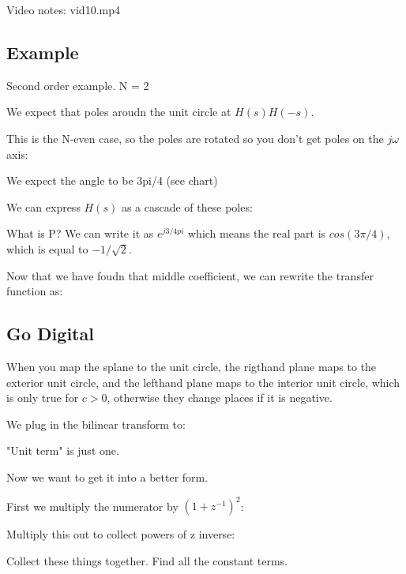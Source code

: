 Video notes: vid10.mp4

\subsection*{Example}
Second order example.  N = 2

We expect that poles aroudn the unit circle at $H(s)H(-s)$.

This is the N-even case, so the poles are rotated so you don't get 
poles on the $j\omega$ axis:

We expect the angle to be 3pi/4 (see chart)


We can express $H(s)$ as a cascade of these poles:



What is P? We can write it as $e^{j3/4pi}$ which means the real part is
$cos(3\pi/4)$, which is equal to $-1/\sqrt{2}$. 


Now that we have foudn that middle coefficient, we can rewrite 
the transfer function as:


\subsection*{Go Digital}

When you map the splane to the unit circle, the rigthand plane maps
to the exterior unit circle, and the lefthand plane maps to the interior unit circle,
which is only true for $c > 0$, otherwise they change places if it is negative.


We plug in the bilinear transform to:


"Unit term" is just one. 

Now we want to get it into a better form. 

First we multiply the numerator by $(1 + z^{-1})^2$:


Multiply this out to collect powers of z inverse:


Collect these things together. Find all the constant terms. 


